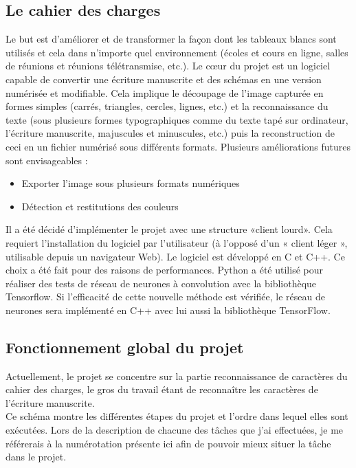 \documentclass[12pt,a4paper]{article}
\begin{document}
\subsection{Le cahier des charges}
Le but est d’améliorer et de transformer la façon dont les tableaux blancs sont utilisés et cela dans n’importe quel environnement (écoles et cours en ligne, salles de réunions et réunions télétransmise, etc.).\bigbreak
Le cœur du projet est un logiciel capable de convertir une écriture manuscrite et des schémas en une version numérisée et modifiable. Cela implique le découpage de l’image capturée en formes simples (carrés, triangles, cercles, lignes, etc.) et la reconnaissance du texte (sous plusieurs formes typographiques comme du texte tapé sur ordinateur, l’écriture manuscrite, majuscules et minuscules, etc.) puis la reconstruction de ceci en un fichier numérisé sous différents formats.\bigbreak
Plusieurs améliorations futures sont envisageables :\bigbreak
\begin{itemize}
\item Exporter l’image sous plusieurs formats numériques
\item Détection et restitutions des couleurs
\end{itemize}
\bigbreak
Il a été décidé d’implémenter le projet avec une structure «client lourd». Cela requiert l’installation du logiciel par l’utilisateur (à l’opposé d’un « client léger », utilisable depuis un navigateur Web).\bigbreak
Le logiciel est développé en C et C++. Ce choix a été fait pour des raisons de performances. Python a été utilisé pour réaliser des tests de réseau de neurones à convolution avec la bibliothèque Tensorflow. Si l'efficacité de cette nouvelle méthode est vérifiée, le réseau de neurones sera implémenté en C++ avec lui aussi la bibliothèque TensorFlow.\bigbreak



\newpage
\subsection{Fonctionnement global du projet}
Actuellement, le projet se concentre sur la partie reconnaissance de caractères du cahier des charges, le gros du travail étant de reconnaître les caractères de l'écriture manuscrite.\\ 
Ce schéma montre les différentes étapes du projet et l’ordre dans lequel elles sont exécutées. Lors de la description de chacune des tâches que j’ai effectuées, je me référerais à la numérotation présente ici afin de pouvoir mieux situer la tâche dans le projet.
\end{document}
